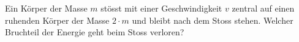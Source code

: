 Ein Körper der Masse $m$ stösst mit einer Geschwindigkeit $v$ zentral auf einen ruhenden Körper der Masse $2\cdot m$ und bleibt nach dem Stoss stehen. Welcher Bruchteil der Energie geht beim Stoss verloren?
